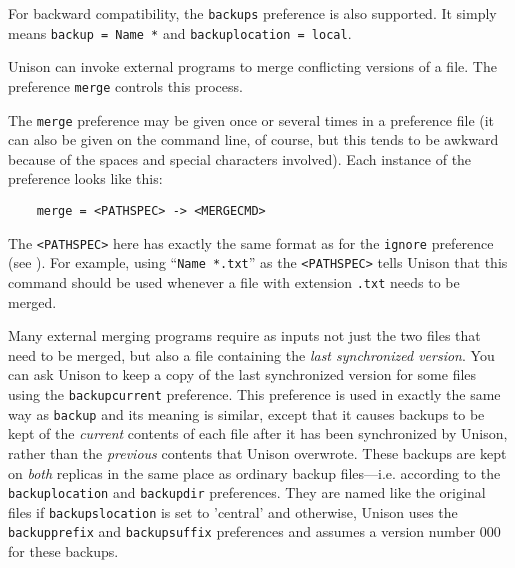 \documentclass{article}
\begin{document}
For backward compatibility, the \verb|backups| preference is also supported.
%
It simply means \verb|backup = Name *| and \verb|backuplocation = local|.



Unison can invoke external programs to merge conflicting versions of a file.
The preference \verb|merge| controls this process.

The \verb|merge| preference may be given once or several times in a
preference file (it can also be given on the command line, of course, but
this tends to be awkward because of the spaces and special characters
involved).  Each instance of the preference looks like this:
\begin{verbatim}
    merge = <PATHSPEC> -> <MERGECMD>
\end{verbatim}
The \verb|<PATHSPEC>| here has exactly the same format as for the
\verb|ignore| preference (see ).  For example,
using ``\verb|Name *.txt|'' as the \verb|<PATHSPEC>| tells Unison that this
command should be used whenever a file with extension \verb|.txt| needs to
be merged.

Many external merging programs require as inputs not just the two files that
need to be merged, but also a file containing the {\em last synchronized
  version}.  You can ask Unison to keep a copy of the last synchronized
version for some files using the \verb|backupcurrent| preference. This
preference is used in exactly the same way as \verb|backup| and its meaning
is similar, except that it causes backups to be kept of the {\em current}
contents of each file after it has been synchronized by Unison, rather than
the {\em previous} contents that Unison overwrote.  These backups are kept
on {\em both} replicas in the same place as ordinary backup files---i.e.
according to the \verb|backuplocation| and \verb|backupdir| preferences.
They are named like the original files if \verb|backupslocation| is set to
'central' and otherwise, Unison uses the \verb|backupprefix| and
\verb|backupsuffix| preferences and assumes a version number 000 for these
backups.
\end{document}
